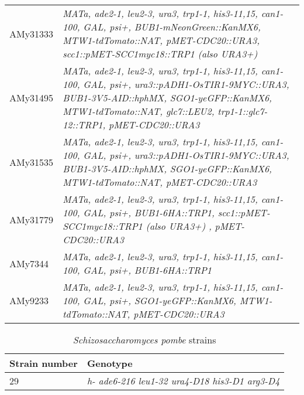 \begin{table}[htb]
\begin{tabular}{p{}p{}}
AMy31333      & \textit{MATa, ade2-1, leu2-3, ura3, trp1-1, his3-11,15, can1-100, GAL,   psi+, BUB1-mNeonGreen::KanMX6, MTW1-tdTomato::NAT, pMET-CDC20::URA3,   scc1::pMET-SCC1myc18::TRP1 (also URA3+)}                                             \\
AMy31495      & \textit{MATa, ade2-1, leu2-3, ura3,   trp1-1, his3-11,15, can1-100, GAL, psi+, ura3::pADH1-OsTIR1-9MYC::URA3,   BUB1-3V5-AID::hphMX, SGO1-yeGFP::KanMX6, MTW1-tdTomato::NAT, glc7::LEU2,   trp1-1::glc7-12::TRP1, pMET-CDC20::URA3} \\
AMy31535      & \textit{MATa, ade2-1, leu2-3, ura3, trp1-1, his3-11,15, can1-100, GAL,   psi+, ura3::pADH1-OsTIR1-9MYC::URA3, BUB1-3V5-AID::hphMX, SGO1-yeGFP::KanMX6,   MTW1-tdTomato::NAT, pMET-CDC20::URA3}                                       \\
AMy31779      & \textit{MATa, ade2-1, leu2-3, ura3, trp1-1, his3-11,15, can1-100, GAL,   psi+, BUB1-6HA::TRP1, scc1::pMET-SCC1myc18::TRP1 (also URA3+) ,   pMET-CDC20::URA3}                                                                         \\
AMy7344       & \textit{MATa, ade2-1, leu2-3, ura3, trp1-1, his3-11,15, can1-100, GAL,   psi+, BUB1-6HA::TRP1}                                                                                                                                       \\
AMy9233       & \textit{MATa, ade2-1, leu2-3, ura3, trp1-1, his3-11,15, can1-100, GAL,   psi+, SGO1-yeGFP::KanMX6, MTW1-tdTomato::NAT, pMET-CDC20::URA3} 
\\
\hline                                                             

\end{tabular}
\end{table}

\begin{table}[htb]
\centering
\renewcommand{\arraystretch}{1.5}
\caption{\textit{Schizosaccharomyces pombe} strains}
\label{tab:pombetable}
\begin{tabular}{p{}p{}}
\hline
\textbf{Strain number} & \textbf{Genotype}
\\
\hline
29 & \textit{h- ade6-216 leu1-32 ura4-D18 his3-D1 arg3-D4}
\\
\hline                                                             

\end{tabular}
\end{table}

